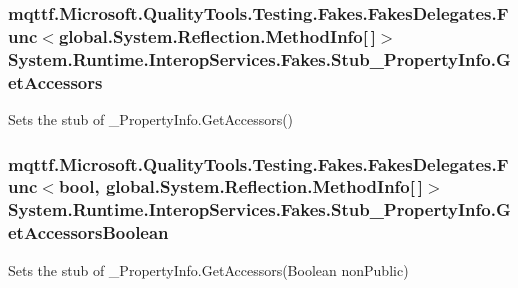 \hypertarget{class_system_1_1_runtime_1_1_interop_services_1_1_fakes_1_1_stub___property_info_a6f164b7716e580a61c0c538652eeddc1}{
\subsubsection[{Get\-Accessors}]{\setlength{\rightskip}{0pt plus 5cm}mqttf.\-Microsoft.\-Quality\-Tools.\-Testing.\-Fakes.\-Fakes\-Delegates.\-Func$<$global.\-System.\-Reflection.\-Method\-Info\mbox{[}$\,$\mbox{]}$>$ System.\-Runtime.\-Interop\-Services.\-Fakes.\-Stub\-\_\-\-Property\-Info.\-Get\-Accessors}}\label{class_system_1_1_runtime_1_1_interop_services_1_1_fakes_1_1_stub___property_info_a6f164b7716e580a61c0c538652eeddc1}


Sets the stub of \-\_\-\-Property\-Info.\-Get\-Accessors()

\hypertarget{class_system_1_1_runtime_1_1_interop_services_1_1_fakes_1_1_stub___property_info_abbe3d0fbe2ea7122bd4e9906ff468fd9}{
\subsubsection[{Get\-Accessors\-Boolean}]{\setlength{\rightskip}{0pt plus 5cm}mqttf.\-Microsoft.\-Quality\-Tools.\-Testing.\-Fakes.\-Fakes\-Delegates.\-Func$<$bool, global.\-System.\-Reflection.\-Method\-Info\mbox{[}$\,$\mbox{]}$>$ System.\-Runtime.\-Interop\-Services.\-Fakes.\-Stub\-\_\-\-Property\-Info.\-Get\-Accessors\-Boolean}}\label{class_system_1_1_runtime_1_1_interop_services_1_1_fakes_1_1_stub___property_info_abbe3d0fbe2ea7122bd4e9906ff468fd9}


Sets the stub of \-\_\-\-Property\-Info.\-Get\-Accessors(\-Boolean non\-Public)

